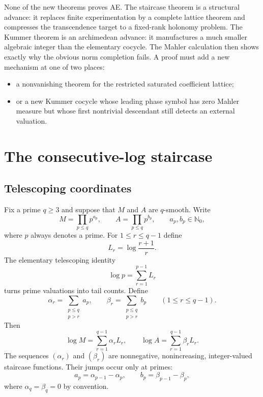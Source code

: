 \documentclass[11pt]{article}
\theoremstyle{definition}
\theoremstyle{remark}
\newcommand{\AEconj}{\textsc{AE}}
\newcommand{\N}{\mathbb N}
\begin{document}
None of the new theorems proves \AEconj.  The staircase theorem is a structural
advance: it replaces finite experimentation by a complete lattice theorem and
compresses the transcendence target to a fixed-rank holonomy problem.  The
Kummer theorem is an archimedean advance: it manufactures a much smaller
algebraic integer than the elementary cocycle.  The Mahler calculation then
shows exactly why the obvious norm completion fails.  A proof must add a new
mechanism at one of two places:
\begin{itemize}
\item a nonvanishing theorem for the restricted saturated coefficient lattice;
\item or a new Kummer cocycle whose leading phase symbol has zero Mahler measure
but whose first nontrivial descendant still detects an external valuation.
\end{itemize}

\section{The consecutive-log staircase}

\subsection{Telescoping coordinates}

Fix a prime $q\ge3$ and suppose that $M$ and $A$ are $q$-smooth.  Write
\begin{equation}\label{eq:valuations}
 M=\prod_{p\le q}p^{a_p},\qquad
 A=\prod_{p\le q}p^{b_p},
 \qquad a_p,b_p\in\N_0,
\end{equation}
where $p$ always denotes a prime.  For $1\le r\le q-1$ define
\begin{equation}\label{eq:Lr}
 L_r=\log\frac{r+1}{r}.
\end{equation}
The elementary telescoping identity
\begin{equation}\label{eq:logptelescope}
 \log p=\sum_{r=1}^{p-1}L_r
\end{equation}
turns prime valuations into tail counts.  Define
\begin{equation}\label{eq:tails}
 \alpha_r=\sum_{\substack{p\le q\\p>r}}a_p,
 \qquad
 \beta_r=\sum_{\substack{p\le q\\p>r}}b_p
 \qquad(1\le r\le q-1).
\end{equation}
Then
\begin{equation}\label{eq:logtail}
 \log M=\sum_{r=1}^{q-1}\alpha_rL_r,
 \qquad
 \log A=\sum_{r=1}^{q-1}\beta_rL_r.
\end{equation}
The sequences $(\alpha_r)$ and $(\beta_r)$ are nonnegative, nonincreasing,
integer-valued staircase functions.  Their jumps occur only at primes:
\begin{equation}\label{eq:jump}
 a_p=\alpha_{p-1}-\alpha_p,
 \qquad
 b_p=\beta_{p-1}-\beta_p,
\end{equation}
where $\alpha_q=\beta_q=0$ by convention.
\end{document}
